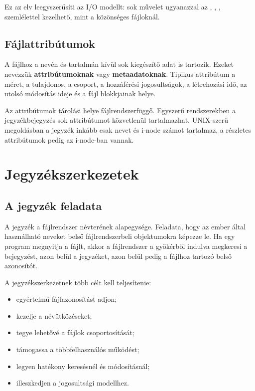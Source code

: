 Ez az elv leegyszerűsíti az I/O modellt: sok művelet ugyanazzal az , , ,  szemlélettel kezelhető, mint a közönséges fájloknál.

\subsection{Fájlattribútumok}

A fájlhoz a nevén és tartalmán kívül sok kiegészítő adat is tartozik. Ezeket nevezzük \textbf{attribútumoknak} vagy \textbf{metaadatoknak}. Tipikus attribútum a méret, a tulajdonos, a csoport, a hozzáférési jogosultságok, a létrehozási idő, az utolsó módosítás ideje és a fájl blokkjainak helye.

\begin{center}

\end{center}

Az attribútumok tárolási helye fájlrendszerfüggő. Egyszerű rendszerekben a jegyzékbejegyzés sok attribútumot közvetlenül tartalmazhat. UNIX-szerű megoldásban a jegyzék inkább csak nevet és i-node számot tartalmaz, a részletes attribútumok pedig az i-node-ban vannak.

\section{Jegyzékszerkezetek}

\subsection{A jegyzék feladata}

A jegyzék a fájlrendszer névterének alapegysége. Feladata, hogy az ember által használható neveket belső fájlrendszerbeli objektumokra képezze le. Ha egy program megnyitja a  fájlt, akkor a fájlrendszer a gyökérből indulva megkeresi a  bejegyzést, azon belül a  jegyzéket, azon belül pedig a  fájlhoz tartozó belső azonosítót.

A jegyzékszerkezetnek több célt kell teljesítenie:

\begin{itemize}
  \item egyértelmű fájlazonosítást adjon;
  \item kezelje a névütközéseket;
  \item tegye lehetővé a fájlok csoportosítását;
  \item támogassa a többfelhasználós működést;
  \item legyen hatékony keresésnél és módosításnál;
  \item illeszkedjen a jogosultsági modellhez.
\end{itemize}

